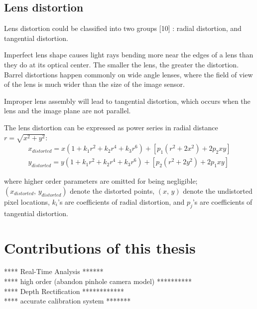 \subsection{Lens distortion}
Lens distortion could be classified into two groups [10] : radial distortion, and tangential distortion.\par
%
Imperfect lens shape causes light rays bending more near the edges of a lens than they do at its optical center. The smaller the lens, the greater the distortion. Barrel distortions happen commonly on wide angle lenses, where the field of view of the lens is much wider than the size of the image sensor.\par%
Improper lens assembly will lead to tangential distortion, which occurs when the lens and the image plane are not parallel.\\\par
%
The lens distortion can be expressed as power series in radial distance \(r = \sqrt{x^2 + y^2}\):
\begin{equation}
%
\begin{aligned}
x_{distorted} =  x (1 + k_1 r^2 + k_2 r^4 + k_3 r^6) + [p_1 (r^2 + 2 x^2) + 2 p_2 xy] %
\\%
y_{distorted} =  y (1 + k_1 r^2 + k_2 r^4 + k_3 r^6) + [p_2 (r^2 + 2 y^2) + 2 p_1 xy]
\end{aligned}
%
\end{equation}%

where higher order parameters are omitted for being negligible; \((x_{distorted}, \, y_{distorted})\) denote the distorted points, \((x, \, y)\) denote the undistorted pixel locations, \(k_i\)'s are coefficients of radial distortion, and \(p_j\)'s are coefficients of tangential distortion.\par
%
\section{Contributions of this thesis}
	****  Real-Time Analysis  ******\\
	****  high order (abandon pinhole camera model) **********\\
	****  Depth Rectification ************\\
	****  accurate calibration system *******\\\\\par
	
